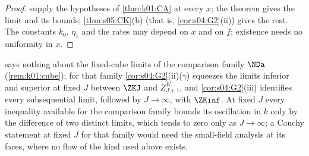 \begin{proof}
 supply the hypotheses of \cref{thm:k01:CA} at every $x$; the theorem gives the limit and its bounds; \cref{thm:s05:CK}(b) (that is, \cref{cor:s04:G2}(ii)) gives the rest. The constants $k_0$, $\eta_1$ and the rates may depend on $x$ and on $f$; existence needs no uniformity in $x$.
\end{proof}

\begin{remark}\label{rem:k01:compfamily}
 says nothing about the fixed-cube limits of the comparison family $\NDa$ (\cref{rem:k01:cube}); for that family \cref{cor:s04:G2}(ii)($\gamma$) squeezes the limits inferior and superior at fixed $J$ between $\ZKJ$ and $Z^K_{J+1}$, and \cref{cor:s04:G2}(iii) identifies every subsequential limit, followed by $J\to\infty$, with $\ZKinf$. At fixed $J$ every inequality available for the comparison family bounds its oscillation in $k$ only by the difference of two distinct limits, which tends to zero only as $J\to\infty$; a Cauchy statement at fixed $J$ for that family would need the small-field analysis at its faces, where no flow of the kind used above exists.
\end{remark}
